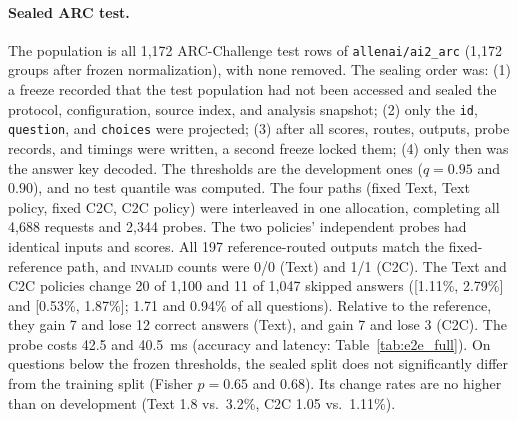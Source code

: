 \paragraph{Sealed ARC test.} The population is all 1,172 ARC-Challenge test rows of \texttt{allenai/ai2\_arc} (1,172 groups after frozen normalization), with none removed. The sealing order was: (1) a freeze recorded that the test population had not been accessed and sealed the protocol, configuration, source index, and analysis snapshot; (2) only the \texttt{id}, \texttt{question}, and \texttt{choices} were projected; (3) after all scores, routes, outputs, probe records, and timings were written, a second freeze locked them; (4) only then was the answer key decoded. The thresholds are the development ones ($q=0.95$ and $0.90$), and no test quantile was computed. The four paths (fixed Text, Text policy, fixed C2C, C2C policy) were interleaved in one allocation, completing all 4,688 requests and 2,344 probes. The two policies' independent probes had identical inputs and scores. All 197 reference-routed outputs match the fixed-reference path, and \textsc{invalid} counts were 0/0 (Text) and 1/1 (C2C). The Text and C2C policies change 20 of 1,100 and 11 of 1,047 skipped answers ([1.11\%, 2.79\%] and [0.53\%, 1.87\%]; 1.71 and 0.94\% of all questions). Relative to the reference, they gain 7 and lose 12 correct answers (Text), and gain 7 and lose 3 (C2C). The probe costs 42.5 and 40.5~ms (accuracy and latency: Table~\ref{tab:e2e_full}). On questions below the frozen thresholds, the sealed split does not significantly differ from the training split (Fisher $p=0.65$ and $0.68$). Its change rates are no higher than on development (Text 1.8 vs.\ 3.2\%, C2C 1.05 vs.\ 1.11\%).

